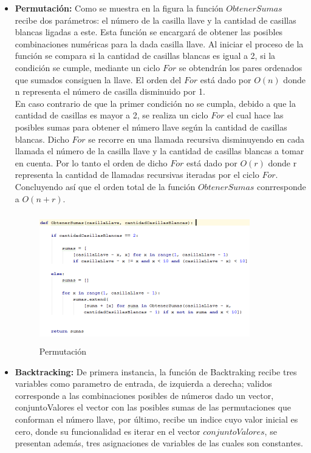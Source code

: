 \documentclass[journal]{IEEEtran}
\begin{document}
\newpage
	\begin{itemize}
		\item{\bf Permutación:} Como se muestra en la figura la función $ObtenerSumas$ recibe dos parámetros: el número de la casilla llave y la cantidad de casillas blancas ligadas a este. Esta función se encargará de obtener las posibles combinaciones numéricas para la dada casilla llave. Al iniciar el proceso de la función se compara si la cantidad de casillas blancas es igual a 2, si la condición se cumple, mediante un ciclo $For$ se obtendrán los pares ordenados que sumados consiguen la llave. El orden del $For$ está dado por $O(n)$ donde n representa el número de casilla disminuido por 1. \\En caso contrario de que la primer condición no se cumpla, debido a que la cantidad de casillas es mayor a 2, se realiza un ciclo $For$ el cual hace las posibles sumas para obtener el número llave según la cantidad de casillas blancas. Dicho $For$ se recorre en una llamada recursiva disminuyendo en cada llamada el número de la casilla llave y la cantidad de casillas blancas a tomar en cuenta. Por lo tanto el orden de dicho $For$ está dado por $O(r)$ donde r representa la cantidad de llamadas recursivas iteradas por el ciclo $For$. \\Concluyendo así que el orden total de la función $ObtenerSumas$ conrresponde a $O(n + r)$.
		
		\begin{figure}[h]
			\centering
			\includegraphics[height= 160pt, width=260pt]{ObtenerSumas.png}
			\caption{Permutación}
		\end{figure}		
		
		\newpage				
		\item{\bf Backtracking:}	De primera instancia, la función de Backtraking recibe tres variables como parametro de entrada, de izquierda a derecha; validos corresponde a las combinaciones posibles de números dado un vector, conjuntoValores el vector con las posibles sumas de las permutaciones que conforman el número llave, por último, recibe un indice cuyo valor inicial es cero, donde su funcionalidad es iterar en el vector $conjuntoValores$, se presentan además, tres asignaciones de variables de las cuales son constantes.


\end{itemize}
\end{document}
